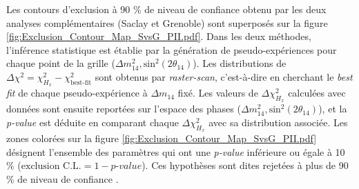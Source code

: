 Les contours d'exclusion à 90 \% de niveau de confiance obtenu par les deux analyses complémentaires (Saclay et Grenoble) sont superposés sur la figure \ref{fig:Exclusion_Contour_Map_SvsG_PII.pdf}. Dans les deux méthodes, l'inférence statistique est établie par la génération de pseudo-expériences pour chaque point de la grille ($\Delta m_{14}^2, \textrm{sin}^2\left(2\theta_{14}\right)$). Les distributions de $\Delta\chi^2 = \chi^2_{H_x} - \chi^2_\textrm{best-fit}$ sont obtenus par \textit{raster-scan}, c'est-à-dire en cherchant le \textit{best fit} de chaque pseudo-expérience à $\Delta m_{14}$ fixé. Les valeurs de $\Delta\chi^2_{H_x}$ calculées avec données sont ensuite reportées sur l'espace des phases ($\Delta m_{14}^2, \textrm{sin}^2\left(2\theta_{14}\right)$), et la \textit{p-value} est déduite en comparant chaque $\Delta\chi^2_{H_x}$ avec sa distribution associée. Les zones colorées sur la figure \ref{fig:Exclusion_Contour_Map_SvsG_PII.pdf} désignent l'ensemble des paramètres qui ont une \textit{p-value} inférieure ou égale à 10 \% ($\textrm{exclusion C.L.} = 1 - \textit{p-value}$). Ces hypothèses sont dites \og rejetées à plus de 90 \% de niveau de confiance \fg{}.\\


